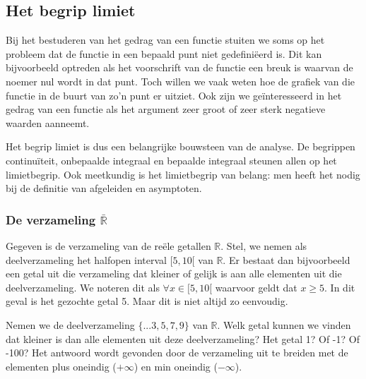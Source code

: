 
\subsection{Het begrip limiet}

Bij het bestuderen van het gedrag van een functie stuiten we soms
op het probleem dat de functie in een bepaald punt niet gedefini\"eerd
is. Dit kan bijvoorbeeld optreden als het voorschrift van de functie
een breuk is waarvan de noemer nul wordt in dat punt. Toch willen
we vaak weten hoe de grafiek van die functie in de buurt van zo'n
punt er uitziet. Ook zijn we ge\"interesseerd in het gedrag van een
functie als het argument zeer groot of zeer sterk negatieve waarden
aanneemt.

\noindent Het begrip limiet is dus een belangrijke bouwsteen van de
analyse. De begrippen continu\"iteit, onbepaalde integraal en bepaalde
integraal steunen allen op het limietbegrip. Ook meetkundig is het
limietbegrip van belang: men heeft het nodig bij de definitie van
afgeleiden en asymptoten.


\subsubsection{De verzameling $\bar{\mathbb{R}}$}

Gegeven is de verzameling van de re\"ele getallen $\mathbb{R}$. Stel,
we nemen als deelverzameling het halfopen interval $[5,10[$ van $\mathbb{R}$.
Er bestaat dan bijvoorbeeld een getal uit die verzameling dat kleiner
of gelijk is aan alle elementen uit die deelverzameling. We noteren
dit als $\forall x\in[5,10[$ waarvoor geldt dat $x\ge5$. In dit
geval is het gezochte getal 5. Maar dit is niet altijd zo eenvoudig.

\medskip{}


\noindent Nemen we de deelverzameling $\{...3,5,7,9\}$ van $\mathbb{R}$.
Welk getal kunnen we vinden dat kleiner is dan alle elementen uit
deze deelverzameling? Het getal 1? Of -1? Of -100? Het antwoord wordt
gevonden door de verzameling uit te breiden met de elementen plus
oneindig ($+\infty$) en min oneindig ($-\infty$).

